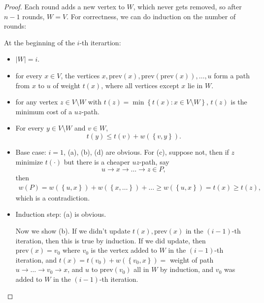 \begin{proof}
    Each round adds a new vertex to \(W\), which never gets removed, so after \(n - 1\) rounds, \(W = V\). For correctness, we can do induction on the number of rounds: 
    \begin{claim}
        At the beginning of the \(i\)-th iterartion:
        \begin{itemize}
            \item [(a)] \(\vert W \vert = i \). 
            \item [(b)] for every \(x \in V\), the vertices \(x, \text{prev}(x), \text{prev}(\text{prev}(x) ), \dots , u  \) form a path from \(x\) to \(u\) of weight \(t(x)\), where all vertices except \(x\) lie in \(W\). 
            \item [(c)] for any vertex \(z \in V \setminus W\) with \(t(z) = \min \left\{ t(x) : x \in V\setminus W \right\} \), \(t(z)\) is the minimum cost of a \(uz\)-path.
            \item [(d)] For every \(y \in V \setminus W\) and \(v \in W\), 
            \[
                t(y) \le t(v) + w(\left\{ v, y \right\}).
            \]
        \end{itemize} 
    \end{claim}   
    \begin{explanation}
        \hfill
        \begin{itemize}
            \item Base case: \(i = 1\), (a), (b), (d) are obvious. For (c), suppose not, then if \(z\) minimize \(t(\cdot)\) but there is a cheaper \(uz\)-path, say 
            \[
                u \to x \to \dots \to z \in P,
            \]
            then 
            \begin{align*}
                w(P) = w(\left\{ u, x \right\} ) + w(\left\{ x, \dots \right\} ) + \dots \ge w(\left\{ u, x \right\} ) = t(x) \ge t(z),
            \end{align*}
            which is a contradiction. 
            \item Induction step: (a) is obvious. 
            
            Now we show (b). If we didn't update \(t(x), \text{prev}(x) \) in the \((i-1)\)-th iteration, then this is true by induction. If we did update, then \(\text{prev}(x) = v_0 \) where \(v_0\) is the vertex added to \(W\) in the \((i-1)\)-th iteration, and \(t(x) = t(v_0) + w(\left\{ v_0, x \right\} ) =\) weight of path \(u \to \dots \to v_0 \to x\), and \(u\) to \(\text{prev}(v_0) \) all in \(W\) by induction, and \(v_0\) was added to \(W\) in the \((i-1)\)-th iteration. 
            

\end{itemize}
\end{explanation}
\end{proof}
